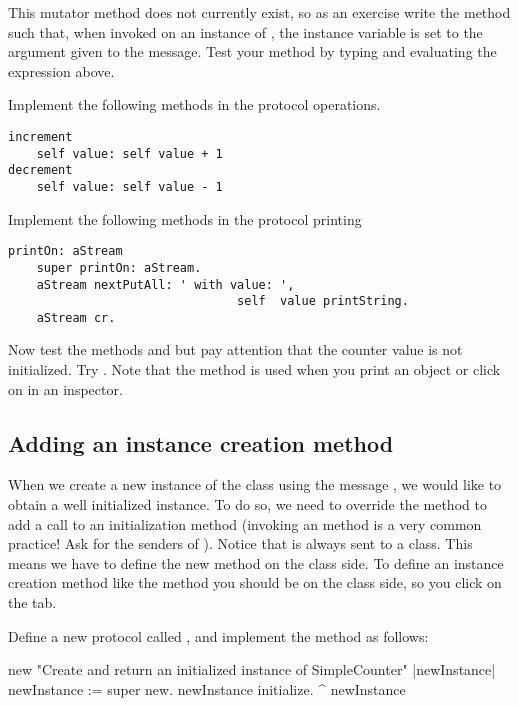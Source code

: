 This mutator method does not currently exist, so as an exercise
write the method  such that, when invoked on
an instance of , the 
instance variable is set to the argument given to the message.
Test your method by typing and evaluating the expression above.

\exercise Implement the following methods in the protocol operations.

\begin{verbatim}
increment
    self value: self value + 1
decrement
    self value: self value - 1
\end{verbatim}

\exercise Implement the following methods in the protocol printing
\begin{verbatim}
printOn: aStream
    super printOn: aStream.
    aStream nextPutAll: ' with value: ', 
    							self  value printString.
    aStream cr.
\end{verbatim}

Now test the methods  and  but pay attention that the counter value is not initialized. Try .
Note that the method  is used when you print an
object or click on  in an inspector. 

\subsection*{Adding an instance creation method}
When we create a new instance of the class 
using the message , we would like to obtain a well
initialized instance. To do so, we need to override the method
 to add a call to an initialization method (invoking
an  method is a very common practice! Ask for
the senders of ). Notice that  is always
sent to a class. This means we have to define the new method on
the class side. To define an instance creation method like the
method  you should be on the class side, so you click
on the  tab. 

\exercise Define a new protocol called ,
and implement the method  as follows:

\begin{code}
new
   "Create and return an initialized instance of SimpleCounter"
   |newInstance|
   newInstance := super new.
   newInstance initialize.
   ^ newInstance
\end{code}

